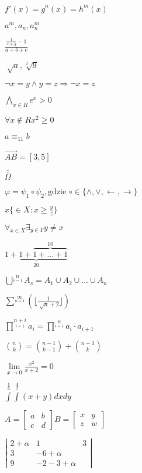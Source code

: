 \documentclass[11pt, a4paper]{article}
\begin{document}
$f'(x)= g ^n (x) = h^m (x)$

$a^m,a_n,a^m_n$

$\frac{\frac{1}{x+y} -1} {a+b+c}$

$\sqrt[]{a}, \sqrt[2]{9}$

$\neg x = y \wedge y=z \Rightarrow \neg x = z $

$ \bigwedge \limits_{x \in R} e^x > 0$

$\forall x \notin Rx^2 \geq 0 $

$a \equiv _{11} b$

$\overrightarrow{AB}= [3,5]$

$\overline{\overline{\Omega}}$

$\varphi = \psi_1 \circ \psi_2, \mbox{gdzie }  \circ \in \lbrace \wedge,\vee,\leftarrow,\rightarrow \rbrace$

$x \lbrace \in X: x \geq \frac{y}{z} \rbrace$

$\forall_{x \in X} \exists_{y \in Y} y \neq x$

$\underbrace{1+1+\overbrace{1+...+1}^{10}}_{20}$

$\bigcup \limits^{n} \limits_{s=1} A_s = A_1 \cup A_2 \cup ... \cup A_n$

$\sum \limits^{\infty} \limits_{n=1} (\lfloor \frac{1}{ \sqrt[]{n}+ 2} \rfloor) $

$\prod \limits^{n+i} \limits_{i=1} a_i = \prod \limits^{n} \limits_{i=1} a_i \cdot a_{i+1}  $

$ {n \choose k} ={ n-1 \choose k-1} + {n-1 \choose k} $

$\lim \limits_{x \rightarrow 0} \frac{x^2}{x+2} = 0$

$\int \limits^1 \limits_0 \int \limits^4 \limits_2 (x+y)dxdy$

$ A = \left[
\begin{array}{rc}
a & b \\ c & d
\end{array}
\right] B = \left[
\begin{array}{rc}
x & y \\ z & w
\end{array}
\right]$

$\left|
\begin{array}{ccc}
2+\alpha & 1 & 3 \\ 3 & -6+ \alpha \\ 9 & -2 -3+\alpha
\end{array}
\right|$
\end{document}
